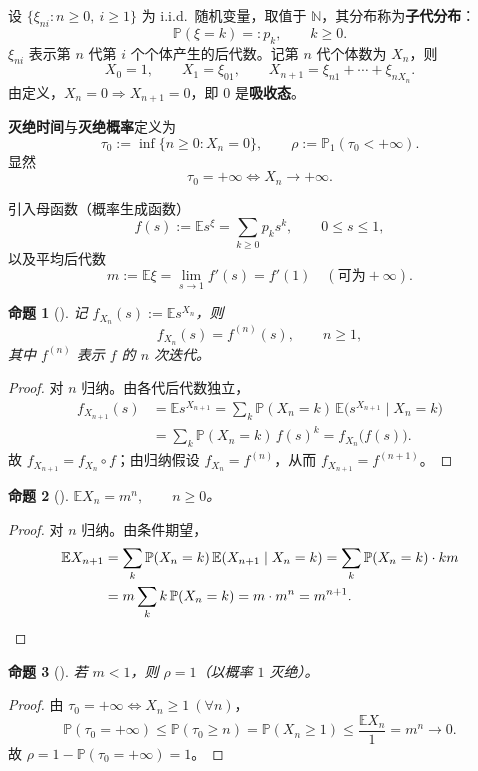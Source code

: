 \documentclass[lang=cn,10pt,newtx,thmcnt=chapter,mode=simple]{vividbook}
\providecommand{\N}{}\renewcommand{\N}{\mathbb{N}}
\providecommand{\E}{}\renewcommand{\E}{\mathbb{E}}
\providecommand{\Pp}{}\renewcommand{\Pp}{\mathbb{P}}
\theoremstyle{vividthm}
\newtheorem*{vividproposition}{命题}
\theoremstyle{vividdef}
\theoremstyle{vividexa}
\theoremstyle{vividrem}
\renewenvironment{proposition}[1][]{\begin{vividproposition}[#1]}{\end{vividproposition}}
\begin{document}
设 $\{\xi_{ni}:n\ge0,\ i\ge1\}$ 为 i.i.d.\ 随机变量，取值于 $\N$，其分布称为\textbf{子代分布}：
\[
\Pp(\xi=k)=:p_k,\qquad k\ge0 .
\]
$\xi_{ni}$ 表示第 $n$ 代第 $i$ 个个体产生的后代数。记第 $n$ 代个体数为 $X_n$，则
\[
X_0=1,\qquad X_1=\xi_{01},\qquad X_{n+1}=\xi_{n1}+\cdots+\xi_{nX_n}.
\]
由定义，$X_n=0\Rightarrow X_{n+1}=0$，即 $0$ 是\textbf{吸收态}。

\textbf{灭绝时间}与\textbf{灭绝概率}定义为
\[
\tau_0:=\inf\{n\ge0:X_n=0\},\qquad \rho:=\Pp_1(\tau_0<+\infty).
\]
显然
\[
\tau_0=+\infty\iff X_n\to+\infty .
\]

引入母函数（概率生成函数）
\[
f(s):=\E s^{\xi}=\sum_{k\ge0}p_ks^k,\qquad 0\le s\le1,
\]
以及平均后代数
\[
m:=\E\xi=\lim_{s\to1}f'(s)=f'(1)\quad(\text{可为}+\infty).
\]

\begin{proposition}
记 $f_{X_n}(s):=\E s^{X_n}$，则
\[
f_{X_n}(s)=f^{(n)}(s),\qquad n\ge1,
\]
其中 $f^{(n)}$ 表示 $f$ 的 $n$ 次迭代。
\end{proposition}

\begin{proof}
对 $n$ 归纳。由各代后代数独立，
\begin{align*}
f_{X_{n+1}}(s)
&=\E s^{X_{n+1}}
=\sum_k\Pp(X_n=k)\,\E\bigl(s^{X_{n+1}}\mid X_n=k\bigr)\\
&=\sum_k\Pp(X_n=k)\,f(s)^k
=f_{X_n}\bigl(f(s)\bigr).
\end{align*}
故 $f_{X_{n+1}}=f_{X_n}\circ f$；由归纳假设 $f_{X_n}=f^{(n)}$，从而 $f_{X_{n+1}}=f^{(n+1)}$。
\end{proof}

\begin{proposition}
$\E X_n=m^n,\qquad n\ge0$。
\end{proposition}

\begin{proof}
对 $n$ 归纳。由条件期望，
\begin{align*}
\E X_{n+1}
&=\sum_k\Pp(X_n=k)\,\E(X_{n+1}\mid X_n=k)
=\sum_k\Pp(X_n=k)\cdot km\\
&=m\sum_k k\,\Pp(X_n=k)
=m\cdot m^n
=m^{n+1}. \qedhere
\end{align*}
\end{proof}

\begin{proposition}
若 $m<1$，则 $\rho=1$（以概率 $1$ 灭绝）。
\end{proposition}

\begin{proof}
由 $\tau_0=+\infty\iff X_n\ge1\ (\forall n)$，
\[
\Pp(\tau_0=+\infty)\le\Pp(\tau_0\ge n)=\Pp(X_n\ge1)\le\frac{\E X_n}{1}=m^n\longrightarrow0 .
\]
故 $\rho=1-\Pp(\tau_0=+\infty)=1$。
\end{proof}
\end{document}
